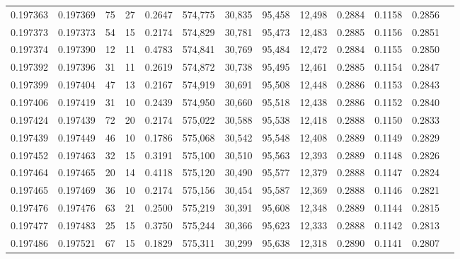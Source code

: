 \begin{tabular}{rrrrrrrrrrrrr}
0.197363 & 0.197369 &    75 &  27 &                                     0.2647 & 574,775 &  30,835 &  95,458 &  12,498 & 0.2884 & 0.1158 & 0.2856 \\
0.197373 & 0.197373 &    54 &  15 &                                     0.2174 & 574,829 &  30,781 &  95,473 &  12,483 & 0.2885 & 0.1156 & 0.2851 \\
0.197374 & 0.197390 &    12 &  11 &                                     0.4783 & 574,841 &  30,769 &  95,484 &  12,472 & 0.2884 & 0.1155 & 0.2850 \\
0.197392 & 0.197396 &    31 &  11 &                                     0.2619 & 574,872 &  30,738 &  95,495 &  12,461 & 0.2885 & 0.1154 & 0.2847 \\
0.197399 & 0.197404 &    47 &  13 &                                     0.2167 & 574,919 &  30,691 &  95,508 &  12,448 & 0.2886 & 0.1153 & 0.2843 \\
0.197406 & 0.197419 &    31 &  10 &                                     0.2439 & 574,950 &  30,660 &  95,518 &  12,438 & 0.2886 & 0.1152 & 0.2840 \\
0.197424 & 0.197439 &    72 &  20 &                                     0.2174 & 575,022 &  30,588 &  95,538 &  12,418 & 0.2888 & 0.1150 & 0.2833 \\
0.197439 & 0.197449 &    46 &  10 &                                     0.1786 & 575,068 &  30,542 &  95,548 &  12,408 & 0.2889 & 0.1149 & 0.2829 \\
0.197452 & 0.197463 &    32 &  15 &                                     0.3191 & 575,100 &  30,510 &  95,563 &  12,393 & 0.2889 & 0.1148 & 0.2826 \\
0.197464 & 0.197465 &    20 &  14 &                                     0.4118 & 575,120 &  30,490 &  95,577 &  12,379 & 0.2888 & 0.1147 & 0.2824 \\
0.197465 & 0.197469 &    36 &  10 &                                     0.2174 & 575,156 &  30,454 &  95,587 &  12,369 & 0.2888 & 0.1146 & 0.2821 \\
0.197476 & 0.197476 &    63 &  21 &                                     0.2500 & 575,219 &  30,391 &  95,608 &  12,348 & 0.2889 & 0.1144 & 0.2815 \\
0.197477 & 0.197483 &    25 &  15 &                                     0.3750 & 575,244 &  30,366 &  95,623 &  12,333 & 0.2888 & 0.1142 & 0.2813 \\
0.197486 & 0.197521 &    67 &  15 &                                     0.1829 & 575,311 &  30,299 &  95,638 &  12,318 & 0.2890 & 0.1141 & 0.2807 \\

\end{tabular}
